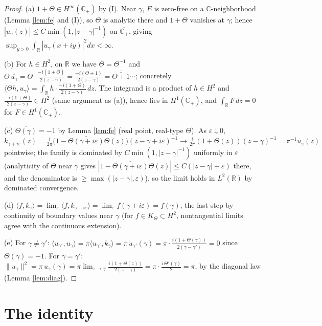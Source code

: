 \documentclass[11pt]{article}
\newcommand{\C}{\mathbb{C}}
\newcommand{\R}{\mathbb{R}}
\newcommand{\Hp}{\C_{+}}
\newcommand{\Th}{\Theta}
\begin{document}
\begin{proof}
(a) $1+\Th\in H^\infty(\Hp)$ by (I). Near $\gamma$, $E$ is zero-free on a
$\C$-neighborhood (Lemma \ref{lem:fe} and (I)), so $\Th$ is analytic there and
$1+\Th$ vanishes at $\gamma$; hence $|u_\gamma(z)|\le C\min(1,|z-\gamma|^{-1})$
on $\overline{\Hp}$, giving $\sup_{y>0}\int_\R|u_\gamma(x+iy)|^2dx<\infty$.

(b) For $h\in H^2$, on $\R$ we have $\overline{\Th}=\Th^{-1}$ and
$\Th\,\overline{u_\gamma}
=\Th\cdot\frac{-i(1+\overline{\Th})}{2(z-\gamma)}
=\frac{-i(\Th+1)}{2(z-\gamma)}=\overline{\overline{\Th+1}}\cdots$;
concretely $\langle \Th h,u_\gamma\rangle
=\int_\R h\cdot\frac{-i(1+\Th)}{2(z-\gamma)}\,dz$. The integrand is a product
of $h\in H^2$ and $\frac{-i(1+\Th)}{2(z-\gamma)}\in H^2$ (same argument as
(a)), hence lies in $H^1(\Hp)$, and $\int_\R F\,dz=0$ for $F\in H^1(\Hp)$.

(c) $\overline{\Th(\gamma)}=-1$ by Lemma \ref{lem:fe} (real point, real-type
$\Th$). As $\varepsilon\downarrow0$,
$k_{\gamma+i\varepsilon}(z)=\tfrac{i}{2\pi}
\big(1-\overline{\Th(\gamma+i\varepsilon)}\Th(z)\big)(z-\gamma+i\varepsilon)^{-1}
\to\tfrac{i}{2\pi}(1+\Th(z))(z-\gamma)^{-1}=\pi^{-1}u_\gamma(z)$ pointwise; the
family is dominated by $C\min(1,|z-\gamma|^{-1})$ uniformly in $\varepsilon$
(analyticity of $\Th$ near $\gamma$ gives $|1-\overline{\Th(\gamma+i\varepsilon)}
\Th(z)|\le C(|z-\gamma|+\varepsilon)$ there, and the denominator is
$\ge\max(|z-\gamma|,\varepsilon)$), so the limit holds in $L^2(\R)$ by
dominated convergence.

(d) $\langle f,k_\gamma\rangle=\lim_\varepsilon\langle
f,k_{\gamma+i\varepsilon}\rangle=\lim_\varepsilon f(\gamma+i\varepsilon)
=f(\gamma)$, the last step by continuity of boundary values near $\gamma$
(for $f\in K_\Th\subset H^2$, nontangential limits agree with the continuous
extension).

(e) For $\gamma\neq\gamma'$:
$\langle u_{\gamma'},u_\gamma\rangle=\pi\langle u_{\gamma'},k_\gamma\rangle
=\pi\,u_{\gamma'}(\gamma)=\pi\cdot\frac{i(1+\Th(\gamma))}{2(\gamma-\gamma')}=0$
since $\Th(\gamma)=-1$. For $\gamma=\gamma'$:
$\|u_\gamma\|^2=\pi\,u_\gamma(\gamma)
=\pi\lim_{z\to\gamma}\frac{i(1+\Th(z))}{2(z-\gamma)}
=\pi\cdot\frac{i\,\Th'(\gamma)}{2}=\pi$, by the diagonal law
(Lemma \ref{lem:diag}).
\end{proof}

\section{The identity}
\end{document}
